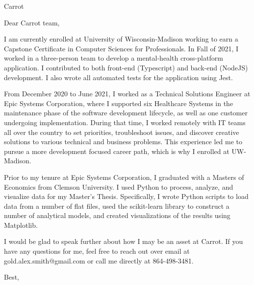 \documentclass[a4paper, 10pt]{letter}
\begin{document}
	\begin{letter}
	{
	   Carrot 
	}

		    \opening{Dear Carrot team,}


		I am currently enrolled at University of Wisconsin-Madison working to earn a Capstone Certificate in Computer Sciences for Professionals. In Fall of 2021, I worked in a three-person team to develop a mental-health cross-platform application. I contributed to both front-end (Typescript) and back-end (NodeJS) development. I also wrote all automated tests for the application using Jest. 

		From December 2020 to June 2021, I worked as a Technical Solutions Engineer at Epic Systems Corporation, where I supported six Healthcare Systems in the maintenance phase of the software development lifecycle, as well as one customer undergoing implementation. During that time, I worked remotely with IT teams all over the country to set priorities, troubleshoot issues, and discover creative solutions to various technical and business problems. This experience led me to pursue a more development focused career path, which is why I enrolled at UW-Madison.

		Prior to my tenure at Epic Systems Corporation, I graduated with a Masters of Economics from Clemson University. I used Python to process, analyze, and visualize data for my Master’s Thesis. Specifically, I wrote Python scripts to load data from a number of flat files, used the scikit-learn library to construct a number of analytical models, and created visualizations of the results using Matplotlib.

		I would be glad to speak further about how I may be an asset at Carrot. If you have any questions for me, feel free to reach out over email at gold.alex.smith@gmail.com or call me directly at 864-498-3481. 


		    \closing{Best,}

		    \end{letter}
		    
\end{document}

